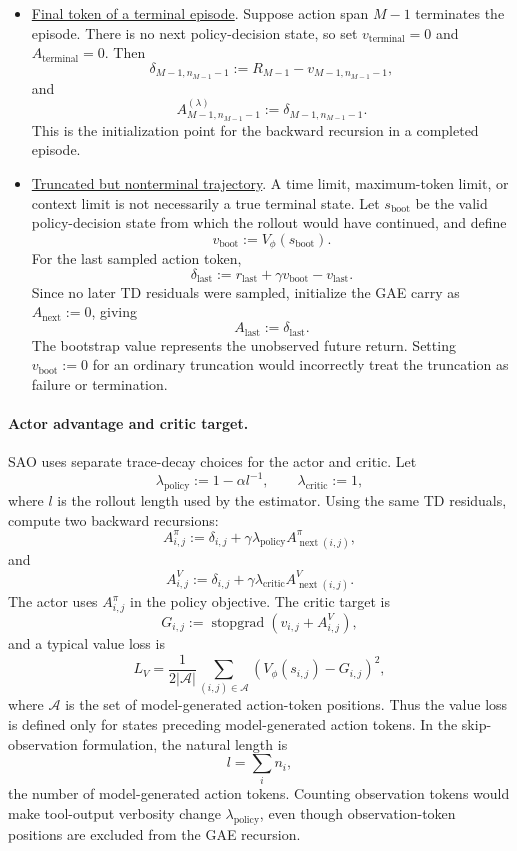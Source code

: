 \begin{itemize}

    \item \underline{Final token of a terminal episode}. Suppose action span $M-1$ terminates the episode. There is no next policy-decision state, so set $v_{\mathrm{terminal}}=0$ and $A_{\mathrm{terminal}}=0$. Then
        \[
            \delta_{M-1,n_{M-1}-1}:=R_{M-1}-v_{M-1,n_{M-1}-1},
        \]
        and
        \[
            A^{(\lambda)}_{M-1,n_{M-1}-1}:=\delta_{M-1,n_{M-1}-1}.
        \]
        This is the initialization point for the backward recursion in a completed episode.

    \item \underline{Truncated but nonterminal trajectory}. A time limit, maximum-token limit, or context limit is not necessarily a true terminal state. Let $s_{\mathrm{boot}}$ be the valid policy-decision state from which the rollout would have continued, and define
        \[
            v_{\mathrm{boot}}:=V_\phi(s_{\mathrm{boot}}).
        \]
        For the last sampled action token,
        \[
            \delta_{\mathrm{last}}
            :=
            r_{\mathrm{last}}+\gamma v_{\mathrm{boot}}-v_{\mathrm{last}}.
        \]
        Since no later TD residuals were sampled, initialize the GAE carry as $A_{\mathrm{next}}:=0$, giving
        \[
            A_{\mathrm{last}}:=\delta_{\mathrm{last}}.
        \]
        The bootstrap value represents the unobserved future return. Setting $v_{\mathrm{boot}}:=0$ for an ordinary truncation would incorrectly treat the truncation as failure or termination.

\end{itemize}

\paragraph{Actor advantage and critic target.}
SAO uses separate trace-decay choices for the actor and critic. Let
\[
    \lambda_{\mathrm{policy}} := 1-\alpha l^{-1},
    \qquad
    \lambda_{\mathrm{critic}} := 1,
\]
where $l$ is the rollout length used by the estimator. Using the same TD residuals, compute two backward recursions:
\[
    A^\pi_{i,j}
    :=
    \delta_{i,j}
    +
    \gamma\lambda_{\mathrm{policy}}
    A^\pi_{\operatorname{next}(i,j)},
\]
and
\[
    A^V_{i,j}
    :=
    \delta_{i,j}
    +
    \gamma\lambda_{\mathrm{critic}}
    A^V_{\operatorname{next}(i,j)}.
\]
The actor uses $A^\pi_{i,j}$ in the policy objective. The critic target is
\[
    G_{i,j}
    :=
    \operatorname{stopgrad}\left(v_{i,j}+A^V_{i,j}\right),
\]
and a typical value loss is
\[
    L_V
    =
    \frac{1}{2|\mathcal{A}|}\sum_{(i,j)\in\mathcal{A}}
    \left(V_\phi(s_{i,j})-G_{i,j}\right)^2,
\]
where $\mathcal{A}$ is the set of model-generated action-token positions. Thus the value loss is defined only for states preceding model-generated action tokens. In the skip-observation formulation, the natural length is
\[
    l=\sum_i n_i,
\]
the number of model-generated action tokens. Counting observation tokens would make tool-output verbosity change $\lambda_{\mathrm{policy}}$, even though observation-token positions are excluded from the GAE recursion.

